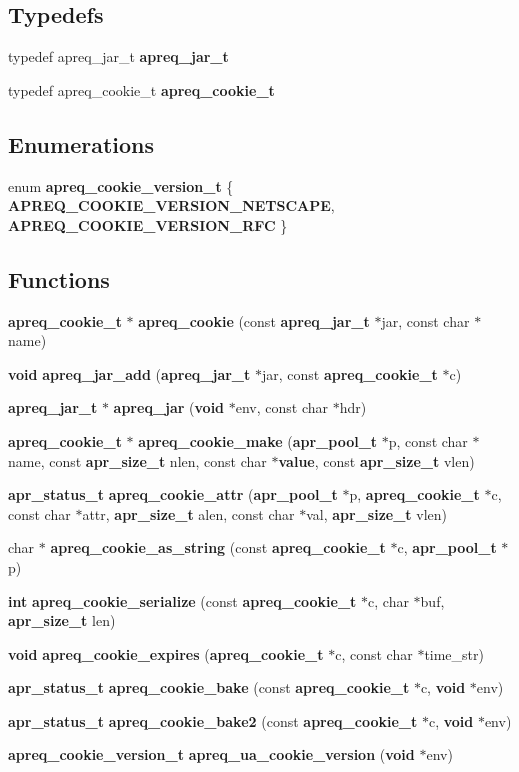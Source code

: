 \subsection*{Typedefs}
\begin{CompactItemize}
\item 
typedef apreq\_\-jar\_\-t {\bf apreq\_\-jar\_\-t}
\item 
typedef apreq\_\-cookie\_\-t {\bf apreq\_\-cookie\_\-t}
\end{CompactItemize}
\subsection*{Enumerations}
\begin{CompactItemize}
\item 
enum {\bf apreq\_\-cookie\_\-version\_\-t} \{ {\bf APREQ\_\-COOKIE\_\-VERSION\_\-NETSCAPE}, 
{\bf APREQ\_\-COOKIE\_\-VERSION\_\-RFC}
 \}
\end{CompactItemize}
\subsection*{Functions}
\begin{CompactItemize}
\item 
{\bf apreq\_\-cookie\_\-t} $\ast$ {\bf apreq\_\-cookie} (const {\bf apreq\_\-jar\_\-t} $\ast$jar, const char $\ast$name)
\item 
{\bf void} {\bf apreq\_\-jar\_\-add} ({\bf apreq\_\-jar\_\-t} $\ast$jar, const {\bf apreq\_\-cookie\_\-t} $\ast$c)
\item 
{\bf apreq\_\-jar\_\-t} $\ast$ {\bf apreq\_\-jar} ({\bf void} $\ast$env, const char $\ast$hdr)
\item 
{\bf apreq\_\-cookie\_\-t} $\ast$ {\bf apreq\_\-cookie\_\-make} ({\bf apr\_\-pool\_\-t} $\ast$p, const char $\ast$name, const {\bf apr\_\-size\_\-t} nlen, const char $\ast${\bf value}, const {\bf apr\_\-size\_\-t} vlen)
\item 
{\bf apr\_\-status\_\-t} {\bf apreq\_\-cookie\_\-attr} ({\bf apr\_\-pool\_\-t} $\ast$p, {\bf apreq\_\-cookie\_\-t} $\ast$c, const char $\ast$attr, {\bf apr\_\-size\_\-t} alen, const char $\ast$val, {\bf apr\_\-size\_\-t} vlen)
\item 
char $\ast$ {\bf apreq\_\-cookie\_\-as\_\-string} (const {\bf apreq\_\-cookie\_\-t} $\ast$c, {\bf apr\_\-pool\_\-t} $\ast$p)
\item 
{\bf int} {\bf apreq\_\-cookie\_\-serialize} (const {\bf apreq\_\-cookie\_\-t} $\ast$c, char $\ast$buf, {\bf apr\_\-size\_\-t} len)
\item 
{\bf void} {\bf apreq\_\-cookie\_\-expires} ({\bf apreq\_\-cookie\_\-t} $\ast$c, const char $\ast$time\_\-str)
\item 
{\bf apr\_\-status\_\-t} {\bf apreq\_\-cookie\_\-bake} (const {\bf apreq\_\-cookie\_\-t} $\ast$c, {\bf void} $\ast$env)
\item 
{\bf apr\_\-status\_\-t} {\bf apreq\_\-cookie\_\-bake2} (const {\bf apreq\_\-cookie\_\-t} $\ast$c, {\bf void} $\ast$env)
\item 
{\bf apreq\_\-cookie\_\-version\_\-t} {\bf apreq\_\-ua\_\-cookie\_\-version} ({\bf void} $\ast$env)
\end{CompactItemize}


